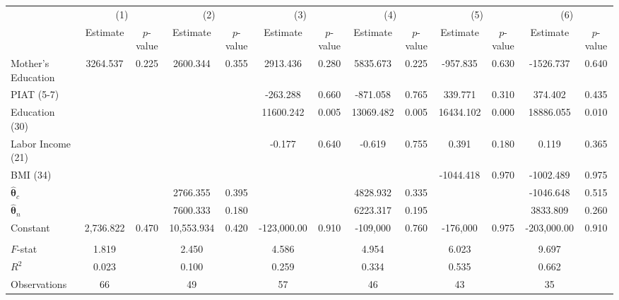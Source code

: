 \begin{tabular}{lcccccccccccc} \toprule
 & \multicolumn{2}{c}{(1)}  &  \multicolumn{2}{c}{(2)}  &  \multicolumn{2}{c}{(3)}  &  \multicolumn{2}{c}{(4)}  & \multicolumn{2}{c}{(5)} & \multicolumn{2}{c}{(6)} \\  
 & Estimate & $p$-value & Estimate & $p$-value & Estimate & $p$-value & Estimate & $p$-value & Estimate & $p$-value & Estimate & $p$-value \\ \midrule
Mother's Education  &  3264.537 &     0.225 &  2600.344 &     0.355 &  2913.436 &     0.280 &  5835.673 &     0.225 &  -957.835 &     0.630 & -1526.737 &     0.640 \\  
PIAT (5-7) &         &         &         &         &  -263.288 &     0.660 &  -871.058 &     0.765 &   339.771 &     0.310 &   374.402 &     0.435 \\  
Education (30) &         &         &         &         & 11600.242 &     0.005 & 13069.482 &     0.005 & 16434.102 &     0.000 & 18886.055 &     0.010 \\  
Labor Income (21) &         &         &         &         &    -0.177 &     0.640 &    -0.619 &     0.755 &     0.391 &     0.180 &     0.119 &     0.365 \\  
BMI (34)  &         &         &         &         &         &         &         &         & -1044.418 &     0.970 & -1002.489 &     0.975 \\  
$\hat{\bm{\theta}}_c$ &         &         &  2766.355 &     0.395 &         &         &  4828.932 &     0.335 &         &         & -1046.648 &     0.515 \\  
$\hat{\bm{\theta}}_n$ &         &         &  7600.333 &     0.180 &         &         &  6223.317 &     0.195 &         &         &  3833.809 &     0.260 \\  
Constant &  2,736.822 &     0.470 & 10,553.934 &     0.420 & -123,000.00 &     0.910 & -109,000 &     0.760 & -176,000 &     0.975 & -203,000.00 &     0.910 \\  \\ \midrule
$F$-stat &     1.819 &      &     2.450 &      &     4.586 &     &     4.954 &     &     6.023 &     &     9.697 &     \\  
$R^2$ &     0.023 &      &     0.100 &      &     0.259 &     &     0.334 &      &     0.535 &     &     0.662 &      \\  
Observations &    66 &      &    49 &      &    57 &      &    46 &    &    43 &     &    35 &    \\  
\bottomrule \end{tabular}
